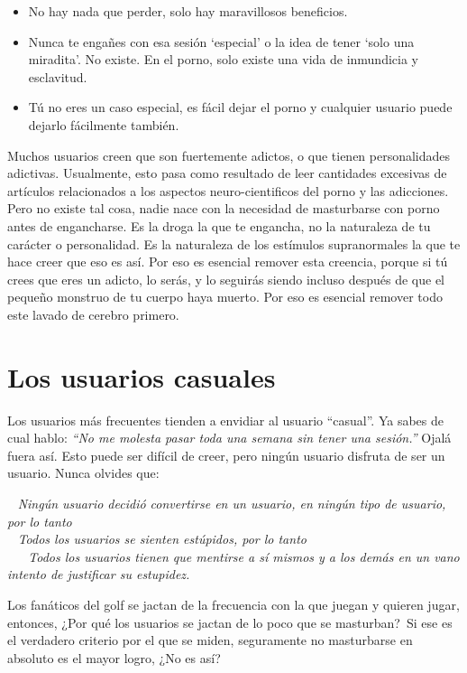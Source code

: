 \documentclass[
  spanish,
  openany]{book}
\providecommand{\tightlist}{%
  \setlength{\itemsep}{0pt}\setlength{\parskip}{0pt}}
\begin{document}
\begin{itemize}
\tightlist
\item
  No hay nada que perder, solo hay maravillosos beneficios.
\item
  Nunca te engañes con esa sesión `especial' o la idea de tener `solo una miradita'. No existe. En el porno, solo existe una vida de inmundicia y esclavitud.
\item
  Tú no eres un caso especial, es fácil dejar el porno y cualquier usuario puede dejarlo fácilmente también.
\end{itemize}

Muchos usuarios creen que son fuertemente adictos, o que tienen personalidades adictivas. Usualmente, esto pasa como resultado de leer cantidades excesivas de artículos relacionados a los aspectos neuro-cientificos del porno y las adicciones. Pero no existe tal cosa, nadie nace con la necesidad de masturbarse con porno antes de engancharse. Es la droga la que te engancha, no la naturaleza de tu carácter o personalidad. Es la naturaleza de los estímulos supranormales la que te hace creer que eso es así. Por eso es esencial remover esta creencia, porque si tú crees que eres un adicto, lo serás, y lo seguirás siendo incluso después de que el pequeño monstruo de tu cuerpo haya muerto. Por eso es esencial remover todo este lavado de cerebro primero.

\hypertarget{los-usuarios-casuales}{%
\chapter{Los usuarios casuales}\label{los-usuarios-casuales}}

Los usuarios más frecuentes tienden a envidiar al usuario ``casual''. Ya sabes de cual hablo: \emph{``No me molesta pasar toda una semana sin tener una sesión.''} Ojalá fuera así. Esto puede ser difícil de creer, pero ningún usuario disfruta de ser un usuario. Nunca olvides que:~

~ \emph{Ningún usuario decidió convertirse en un usuario, en ningún tipo de usuario, por lo tanto}\\
\hspace*{0.333em} ~ \emph{Todos los usuarios se sienten estúpidos, por lo tanto}\\
\hspace*{0.333em} ~ ~ \emph{Todos los usuarios tienen que mentirse a sí mismos y a los demás en un vano intento de justificar su estupidez.}

Los fanáticos del golf se jactan de la frecuencia con la que juegan y quieren jugar, entonces, ¿Por qué los usuarios se jactan de lo poco que se masturban?~Si ese es el verdadero criterio por el que se miden, seguramente no masturbarse en absoluto es el mayor logro, ¿No es así?
\end{document}
